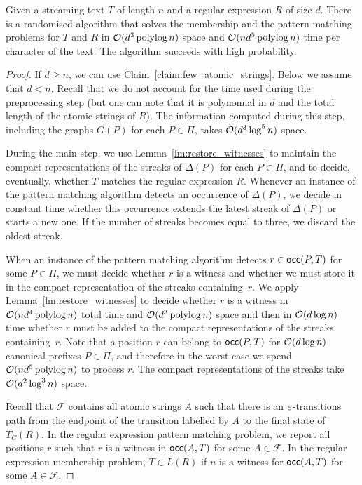 \begin{thm}\label{th:memb}
Given a streaming text $T$ of length $n$ and a regular expression $R$ of size $d$. There is a randomised algorithm that solves the membership and the pattern matching problems for $T$ and $R$ in $\mathcal{O}(d^3\operatorname{polylog} n)$ space and $\mathcal{O}(nd^5\operatorname{polylog} n)$ time per character of the text. The algorithm succeeds with high probability.
\end{thm}
\begin{proof}
If $d \ge n$, we can use Claim~\ref{claim:few_atomic_strings}. Below we assume that $d < n$. Recall that we do not account for the time used during the preprocessing step (but one can note that it is polynomial in $d$ and the total length of the atomic strings of $R$). The information computed during this step, including the graphs $G(P)$ for each $P \in \Pi$, takes $\mathcal{O}(d^3 \log^5 n)$ space. 

During the main step, we use Lemma~\ref{lm:restore_witnesses} to maintain the compact representations of the streaks of $\Delta(P)$ for each $P \in \Pi$, and to decide, eventually, whether $T$ matches the regular expression $R$. Whenever an instance of the pattern matching algorithm detects an occurrence of $\Delta(P)$, we decide in constant time whether this occurrence extends the latest streak of $\Delta(P)$ or starts a new one. If the number of streaks becomes equal to three, we discard the oldest streak. 

When an instance of the pattern matching algorithm detects $r \in \mathsf{occ}(P,T)$ for some $P \in \Pi$, we must decide whether $r$ is a witness and whether we must store it in the compact representation of the streaks containing~$r$. We apply Lemma~\ref{lm:restore_witnesses} to decide whether $r$ is a witness in $\mathcal{O}(n d^4 \operatorname{polylog} n)$ total time and $\mathcal{O}(d^3\operatorname{polylog} n)$ space and then in $\mathcal{O}(d \log n)$ time whether $r$ must be added to the compact representations of the streaks containing~$r$. Note that a position $r$ can belong to $\mathsf{occ}(P,T)$ for $\mathcal{O}(d\log n)$ canonical prefixes $P \in \Pi$, and therefore in the worst case we spend $\mathcal{O}(n d^5 \operatorname{polylog} n)$ to process $r$. The compact representations of the streaks take $\mathcal{O}(d^2 \log^3 n)$ space. 

Recall that $\mathcal{F}$ contains all atomic strings $A$ such that there is an $\varepsilon$-transitions path from the endpoint of the transition labelled by $A$ to the final state of $T_C(R)$. 
In the regular expression pattern matching problem, we report all positions $r$ such that $r$ is a witness in $ \mathsf{occ}(A,T)$ for some $A\in \mathcal{F}$. In the regular expression membership problem, $T \in L(R)$ if $n$ is a witness for $\mathsf{occ}(A,T)$ for some $A\in \mathcal{F}$.
\end{proof}
